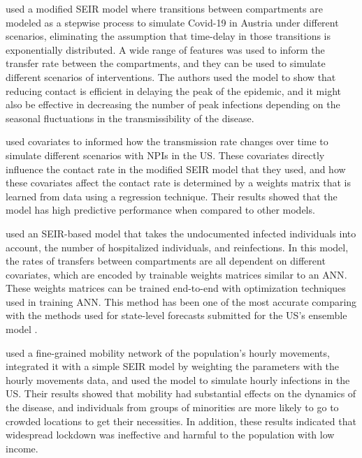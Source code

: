 \citeauthor{schneiderCOVID19PandemicPreparedness2020} \cite{schneiderCOVID19PandemicPreparedness2020} used a modified SEIR model where transitions between compartments are modeled as a stepwise process to simulate Covid-19 in Austria under different scenarios, eliminating the assumption that time-delay in those transitions is exponentially distributed.
A wide range of features was used to inform the transfer rate between the compartments, and they can be used to simulate different scenarios of interventions.
The authors used the model to show that reducing contact is efficient in delaying the peak of the epidemic, and it might also be effective in decreasing the number of peak infections depending on the seasonal fluctuations in the transmissibility of the disease.

\citeauthor{ihmecovid-19forecastingteamModelingCOVID19Scenarios2021} \cite{ihmecovid-19forecastingteamModelingCOVID19Scenarios2021} used covariates to informed how the transmission rate changes over time to simulate different scenarios with \glspl{NPI} in the \gls{US}.
These covariates directly influence the contact rate in the modified SEIR model that they used, and how these covariates affect the contact rate is determined by a weights matrix that is learned from data using a regression technique.
Their results showed that the model has high predictive performance when compared to other models.

\citeauthor{arikInterpretableSequenceLearning} \cite{arikInterpretableSequenceLearning} used an SEIR-based model that takes the undocumented infected individuals into account, the number of hospitalized individuals, and reinfections.
In this model, the rates of transfers between compartments are all dependent on different covariates, which are encoded by trainable weights matrices similar to an \gls{ANN}.
These weights matrices can be trained end-to-end with optimization techniques used in training \gls{ANN}.
This method has been one of the most accurate comparing with the methods used for state-level forecasts submitted for the US’s ensemble model \cite{rayEnsembleForecastsCoronavirus2020}.

\citeauthor{changMobilityNetworkModels2021} \cite{changMobilityNetworkModels2021} used a fine-grained mobility network of the population's hourly movements, integrated it with a simple SEIR model by weighting the parameters with the hourly movements data, and used the model to simulate hourly infections in the US.
Their results showed that mobility had substantial effects on the dynamics of the disease, and individuals from groups of minorities are more likely to go to crowded locations to get their necessities.
In addition, these results indicated that widespread lockdown was ineffective and harmful to the population with low income.

